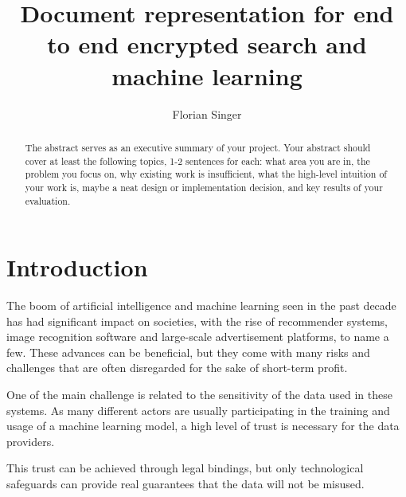 \documentclass[a4paper,11pt,oneside]{report}
\title{Document representation for end to end encrypted search and machine learning}
\author{Florian Singer}
\begin{document}
\maketitle

\begin{abstract}
The abstract serves as an executive summary of your project.
Your abstract should cover at least the following topics, 1-2 sentences for
each: what area you are in, the problem you focus on, why existing work is
insufficient, what the high-level intuition of your work is, maybe a neat
design or implementation decision, and key results of your evaluation.
\end{abstract}

\maketoc

\chapter{Introduction}



The boom of artificial intelligence and machine learning seen in the past decade has had significant impact on societies, with the rise of recommender systems, image recognition software and large-scale advertisement platforms, to name a few. These advances can be beneficial, but they come with many risks and challenges that are often disregarded for the sake of short-term profit.

One of the main challenge is related to the sensitivity of the data used in these systems. As many different actors are usually participating in the training and usage of a machine learning model, a high level of trust is necessary for the data providers. 

This trust can be achieved through legal bindings, but only technological safeguards can provide real guarantees that the data will not be misused.
\end{document}
